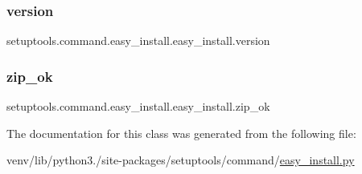 \subsubsection{\texorpdfstring{version}{version}}
{\footnotesize\ttfamily setuptools.\+command.\+easy\+\_\+install.\+easy\+\_\+install.\+version}

\mbox{\label{classsetuptools_1_1command_1_1easy__install_1_1easy__install_a3cf027b47425e5bdedb5b0c6929346ba}} 
\subsubsection{\texorpdfstring{zip\+\_\+ok}{zip\_ok}}
{\footnotesize\ttfamily setuptools.\+command.\+easy\+\_\+install.\+easy\+\_\+install.\+zip\+\_\+ok}



The documentation for this class was generated from the following file\+:\begin{DoxyCompactItemize}
\item 
venv/lib/python3./site-\/packages/setuptools/command/\hyperlink{easy__install_8py}{easy\+\_\+install.\+py}\end{DoxyCompactItemize}
